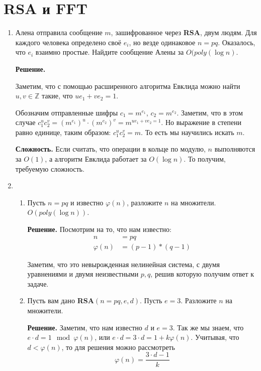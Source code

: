 \section{RSA и FFT}
\begin{enumerate}
	\item Алена отправила сообщение $m$, зашифрованное через \textbf{RSA}, двум людям. Для каждого человека 
	определено своё $e_i$, но везде одинаковое $n = pq$. Оказалось, что $e_i$ взаимно простые. Найдите сообщение 
	Алены за $O(poly(\log n)$.
	
	\textbf{Решение.} 
	
	Заметим, что с помощью расширенного алгоритма Евклида можно найти $u, v \in \mathbb{Z}$ такие, что $ue_1 + 
	ve_2 = 1$.
	
	Обозначим отправленные шифры $c_1 = m^{e_1}$, $c_2 = m^{e_2}$. Заметим, что в этом случае $c_1^u c_2^v = 
	(m^{e_1})^u\cdot(m^{e_2})^v = m^{ue_1 + ve_2 = 1}$. Но выражение в степени равно единице, таким образом: 
	$c_1^u c_2^v = m$. То есть мы научились искать $m$.
	
 	\textbf{Сложность.} Если считать, что операции в кольце по модулю, $n$ выполняются за $O(1)$, а алгоритм 
 	Евклида работает за $O(\log n)$. То получим, требуемую сложность.
	
	\item 
	\begin{enumerate}
		\item Пусть $n = pq$ и известно $\varphi(n)$, разложите $n$ на множители. $O(poly(\log n))$.
		
		\textbf{Решение.} Посмотрим на то, что нам известно:
		\begin{align*}
			n &= pq \\
			\varphi(n) &= (p - 1) * (q - 1)
		\end{align*} 
		
		Заметим, что это невырожденная нелинейная система, с двумя уравнениями и двумя неизвестными $p, q$, решив 
		которую получим ответ к задаче. 
			
		\item Пусть вам дано \textbf{RSA}$(n = pq, e, d)$. Пусть $e = 3$. Разложите $n$ на множители.
		
		\textbf{Решение.}
		Заметим, что нам известно $d$ и $e = 3$. Так же мы знаем, что $e\cdot d = 1\mod \varphi(n)$, или $e\cdot 
		d = 3\cdot d = 1 + k \varphi(n)$. Учитывая, что $d < \varphi(n)$, то для решения можно рассмотреть
		\begin{equation*}
			\varphi(n) = \frac{3\cdot d - 1}{k}
		\end{equation*}
		

\end{enumerate}
\end{enumerate}
